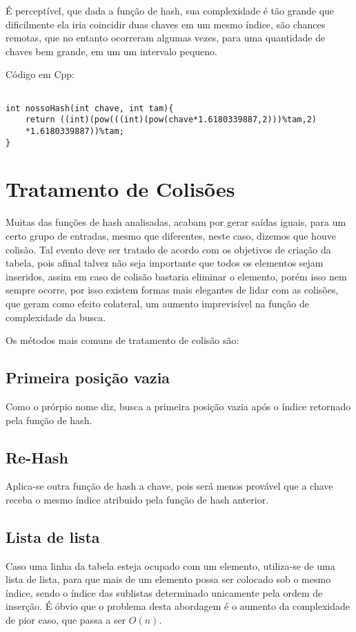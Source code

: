 \documentclass[a4paper]{report}
\begin{document}
É perceptível, que dada a função de hash, sua complexidade é tão grande que dificilmente ela iria coincidir duas chaves em um mesmo índice, são chances remotas, que no entanto ocorreram algumas vezes, para uma quantidade de chaves bem grande, em um um intervalo pequeno.


Código em Cpp:
\begin{verbatim}

int nossoHash(int chave, int tam){
    return ((int)(pow(((int)(pow(chave*1.6180339887,2)))%tam,2)
    *1.6180339887))%tam;
}

\end{verbatim}

\section{Tratamento de Colisões}

Muitas das funções de hash analisadas, acabam por gerar saídas iguais, para um certo grupo de entradas, mesmo que diferentes, neste caso, dizemos que houve colisão. Tal evento deve ser tratado de acordo com os objetivos de criação da tabela, pois afinal talvez não seja importante que todos os elementos sejam inseridos, assim em caso de colisão bastaria eliminar o elemento, porém isso nem sempre ocorre, por isso existem formas mais elegantes de lidar com as colisões, que geram como efeito colateral, um aumento imprevisível na função de complexidade da busca.

Os métodos mais comuns de tratamento de colisão são:

\subsection{Primeira posição vazia}
Como o prórpio nome diz, busca a primeira posição vazia após o índice retornado pela função de hash.

\subsection{Re-Hash}
Aplica-se outra função de hash a chave, pois será menos provável que a chave receba o mesmo índice atribuido pela função de hash anterior.

\subsection{Lista de lista}

Caso uma linha da tabela esteja ocupado com um elemento, utiliza-se de uma lista de lista, para que mais de um elemento possa ser colocado sob o mesmo índice, sendo o índice das sublistas determinado unicamente pela ordem de inserção.  É óbvio que o  problema desta abordagem é  o aumento da complexidade de pior caso, que passa a ser \large$O(n)$.\normalsize
\end{document}
